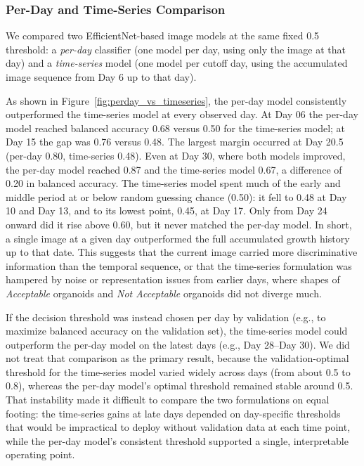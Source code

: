 \documentclass{article}
\begin{document}
\subsubsection{Per-Day and Time-Series Comparison}

We compared two EfficientNet-based image models at the same fixed 0.5 threshold: a \textit{per-day} classifier (one model per day, using only the image at that day) and a \textit{time-series} model (one model per cutoff day, using the accumulated image sequence from Day 6 up to that day).

As shown in Figure~\ref{fig:perday_vs_timeseries}, the per-day model consistently outperformed the time-series model at every observed day. At Day 06 the per-day model reached balanced accuracy 0.68 versus 0.50 for the time-series model; at Day 15 the gap was 0.76 versus 0.48. The largest margin occurred at Day 20.5 (per-day 0.80, time-series 0.48). Even at Day 30, where both models improved, the per-day model reached 0.87 and the time-series model 0.67, a difference of 0.20 in balanced accuracy. The time-series model spent much of the early and middle period at or below random guessing chance (0.50): it fell to 0.48 at Day 10 and Day 13, and to its lowest point, 0.45, at Day 17. Only from Day 24 onward did it rise above 0.60, but it never matched the per-day model. In short, a single image at a given day outperformed the full accumulated growth history up to that date. This suggests that the current image carried more discriminative information than the temporal sequence, or that the time-series formulation was hampered by noise or representation issues from earlier days, where shapes of \textit{Acceptable} organoids and \textit{Not Acceptable} organoids did not diverge much. 

If the decision threshold was instead chosen per day by validation (e.g., to maximize balanced accuracy on the validation set), the time-series model could outperform the per-day model on the latest days (e.g., Day 28--Day 30). We did not treat that comparison as the primary result, because the validation-optimal threshold for the time-series model varied widely across days (from about 0.5 to 0.8), whereas the per-day model's optimal threshold remained stable around 0.5. That instability made it difficult to compare the two formulations on equal footing: the time-series gains at late days depended on day-specific thresholds that would be impractical to deploy without validation data at each time point, while the per-day model's consistent threshold supported a single, interpretable operating point.
\end{document}
